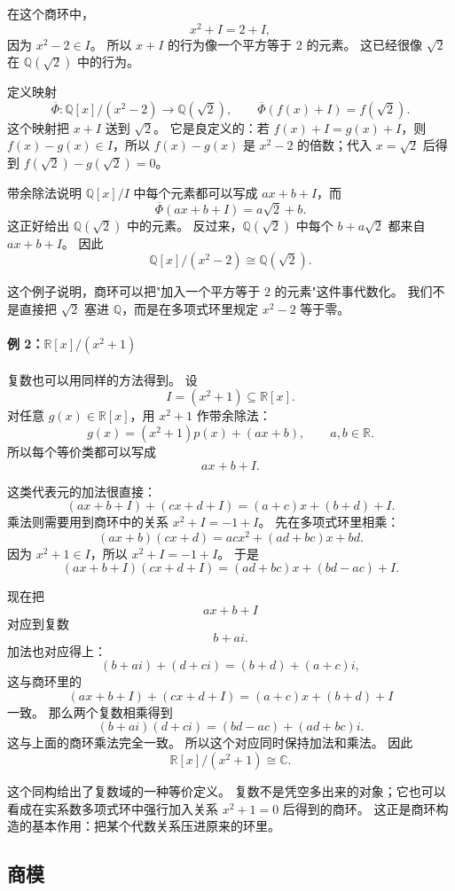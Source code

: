 在这个商环中，
\[
x^2+I=2+I,
\]
因为 $x^2-2\in I$。
所以 $x+I$ 的行为像一个平方等于 $2$ 的元素。
这已经很像 $\sqrt2$ 在 $\mathbb Q(\sqrt2)$ 中的行为。

定义映射
\[
\overline\Phi:\mathbb Q[x]/(x^2-2)\to\mathbb Q(\sqrt2),
\qquad
\overline\Phi(f(x)+I)=f(\sqrt2).
\]
这个映射把 $x+I$ 送到 $\sqrt2$。
它是良定义的：若 $f(x)+I=g(x)+I$，则 $f(x)-g(x)\in I$，所以 $f(x)-g(x)$ 是 $x^2-2$ 的倍数；代入 $x=\sqrt2$ 后得到 $f(\sqrt2)-g(\sqrt2)=0$。

带余除法说明 $\mathbb Q[x]/I$ 中每个元素都可以写成 $ax+b+I$，而
\[
\overline\Phi(ax+b+I)=a\sqrt2+b.
\]
这正好给出 $\mathbb Q(\sqrt2)$ 中的元素。
反过来，$\mathbb Q(\sqrt2)$ 中每个 $b+a\sqrt2$ 都来自 $ax+b+I$。
因此
\[
\mathbb Q[x]/(x^2-2)\cong\mathbb Q(\sqrt2).
\]

这个例子说明，商环可以把"加入一个平方等于 $2$ 的元素"这件事代数化。
我们不是直接把 $\sqrt2$ 塞进 $\mathbb Q$，而是在多项式环里规定 $x^2-2$ 等于零。

\paragraph*{例 2：$\mathbb R[x]/(x^2+1)$}
复数也可以用同样的方法得到。
设
\[
I=(x^2+1)\subseteq \mathbb R[x].
\]
对任意 $g(x)\in\mathbb R[x]$，用 $x^2+1$ 作带余除法：
\[
g(x)=(x^2+1)p(x)+(ax+b),
\qquad a,b\in\mathbb R.
\]
所以每个等价类都可以写成
\[
ax+b+I.
\]

这类代表元的加法很直接：
\[
(ax+b+I)+(cx+d+I)=(a+c)x+(b+d)+I.
\]
乘法则需要用到商环中的关系 $x^2+I=-1+I$。
先在多项式环里相乘：
\[
(ax+b)(cx+d)=acx^2+(ad+bc)x+bd.
\]
因为 $x^2+1\in I$，所以 $x^2+I=-1+I$。
于是
\[
(ax+b+I)(cx+d+I)=(ad+bc)x+(bd-ac)+I.
\]

现在把
\[
ax+b+I
\]
对应到复数
\[
b+ai.
\]
加法也对应得上：
\[
(b+ai)+(d+ci)=(b+d)+(a+c)i,
\]
这与商环里的
\[
(ax+b+I)+(cx+d+I)=(a+c)x+(b+d)+I
\]
一致。
那么两个复数相乘得到
\[
(b+ai)(d+ci)=(bd-ac)+(ad+bc)i.
\]
这与上面的商环乘法完全一致。
所以这个对应同时保持加法和乘法。
因此
\[
\mathbb R[x]/(x^2+1)\cong\mathbb C.
\]

这个同构给出了复数域的一种等价定义。
复数不是凭空多出来的对象；它也可以看成在实系数多项式环中强行加入关系 $x^2+1=0$ 后得到的商环。
这正是商环构造的基本作用：把某个代数关系压进原来的环里。

\subsection{商模}\label{sec:quotient-modules}

